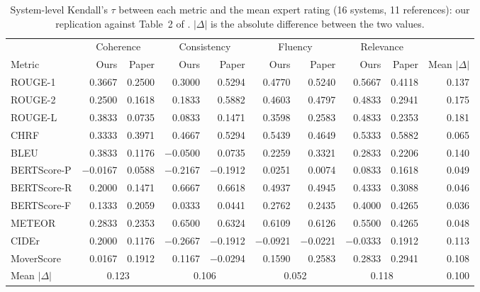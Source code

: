 \documentclass[11pt]{article}
\begin{document}
\begin{table}[t]
\centering
\small
\begin{tabular}{@{}l rr rr rr rr r@{}}
\toprule
& \multicolumn{2}{c}{Coherence} & \multicolumn{2}{c}{Consistency} & \multicolumn{2}{c}{Fluency} & \multicolumn{2}{c}{Relevance} & \\
\cmidrule(lr){2-3}\cmidrule(lr){4-5}\cmidrule(lr){6-7}\cmidrule(lr){8-9}
Metric & Ours & Paper & Ours & Paper & Ours & Paper & Ours & Paper & Mean $|\Delta|$ \\
\midrule
ROUGE-1 & 0.3667 & 0.2500 & 0.3000 & 0.5294 & 0.4770 & 0.5240 & 0.5667 & 0.4118 & 0.137 \\
ROUGE-2 & 0.2500 & 0.1618 & 0.1833 & 0.5882 & 0.4603 & 0.4797 & 0.4833 & 0.2941 & 0.175 \\
ROUGE-L & 0.3833 & 0.0735 & 0.0833 & 0.1471 & 0.3598 & 0.2583 & 0.4833 & 0.2353 & 0.181 \\
CHRF & 0.3333 & 0.3971 & 0.4667 & 0.5294 & 0.5439 & 0.4649 & 0.5333 & 0.5882 & 0.065 \\
BLEU & 0.3833 & 0.1176 & $-$0.0500 & 0.0735 & 0.2259 & 0.3321 & 0.2833 & 0.2206 & 0.140 \\
BERTScore-P & $-$0.0167 & 0.0588 & $-$0.2167 & $-$0.1912 & 0.0251 & 0.0074 & 0.0833 & 0.1618 & 0.049 \\
BERTScore-R & 0.2000 & 0.1471 & 0.6667 & 0.6618 & 0.4937 & 0.4945 & 0.4333 & 0.3088 & 0.046 \\
BERTScore-F & 0.1333 & 0.2059 & 0.0333 & 0.0441 & 0.2762 & 0.2435 & 0.4000 & 0.4265 & 0.036 \\
METEOR & 0.2833 & 0.2353 & 0.6500 & 0.6324 & 0.6109 & 0.6126 & 0.5500 & 0.4265 & 0.048 \\
CIDEr & 0.2000 & 0.1176 & $-$0.2667 & $-$0.1912 & $-$0.0921 & $-$0.0221 & $-$0.0333 & 0.1912 & 0.113 \\
MoverScore & 0.0167 & 0.1912 & 0.1167 & $-$0.0294 & 0.1590 & 0.2583 & 0.2833 & 0.2941 & 0.108 \\
\midrule
Mean $|\Delta|$ & \multicolumn{2}{c}{0.123} & \multicolumn{2}{c}{0.106} & \multicolumn{2}{c}{0.052} & \multicolumn{2}{c}{0.118} & 0.100 \\
\bottomrule
\end{tabular}
\caption{System-level Kendall's $\tau$ between each metric and the mean expert rating (16 systems, 11 references): our replication against Table~2 of \citet{fabbri-etal-2021-summeval}. $|\Delta|$ is the absolute difference between the two values.}
\label{tab:replication}
\end{table}
\end{document}
